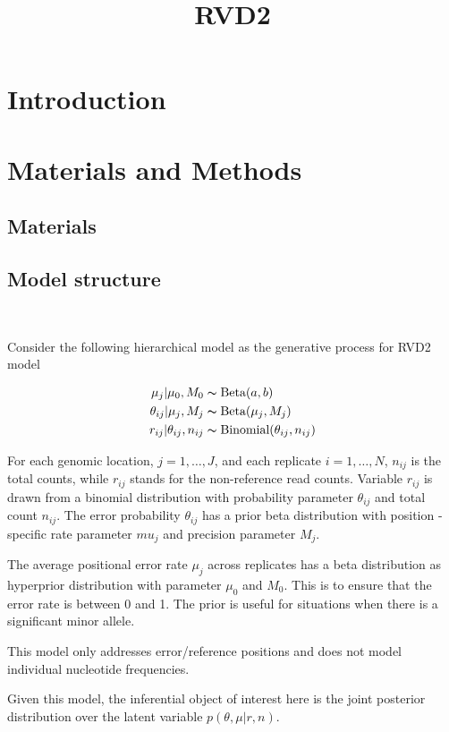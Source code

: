 \documentclass[11pt,reqno]{amsart}
\title{RVD2}
\author{}
\begin{document}
\maketitle

\section{Introduction}

\section{Materials and Methods}

\subsection{Materials}
\subsection{Model structure}\

Consider the following hierarchical model as the generative process for RVD2 model

\begin{align}
\mu_j|\mu_0,M_0 &\thicksim \text{Beta}(a, b)\\
\theta_{ij}|\mu_j,M_j &\thicksim \text{Beta}(\mu_j,M_j)\\
r_{ij}|\theta_{ij},n_{ij} &\thicksim \text{Binomial}(\theta_{ij}, n_{ij})
\end{align}

For each genomic location,  $j=1,\ldots,J$, and each replicate  $i=1,\ldots,N$, $n_{ij}$ is the total counts, while $r_{ij}$ stands for the non-reference read counts. Variable $r_{ij}$ is drawn from a binomial distribution with probability parameter $\theta_{ij}$ and total count $n_{ij}$.  The error probability $\theta_{ij}$ has a prior beta distribution with position -specific rate parameter $mu_j$ and precision parameter $M_j$.

The average positional error rate $\mu_j$ across replicates has a beta distribution as hyperprior distribution with parameter $\mu_0$ and $M_0$. This is to ensure that the error rate is between 0 and 1. The prior is useful for situations when there is a significant minor allele. 

This model only addresses error/reference positions  and does not model individual nucleotide frequencies.

Given this model, the inferential object of interest here is the joint posterior distribution over the latent variable $p(\theta,\mu|r,n)$.
\end{document}

